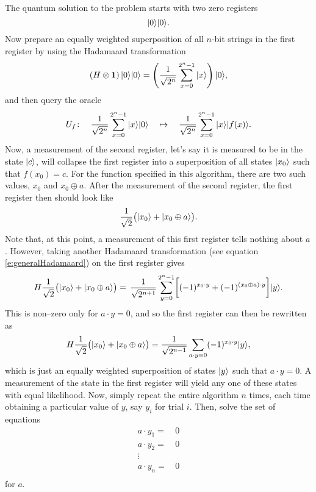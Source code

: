 The quantum solution to the problem starts with two zero registers
\begin{equation}
{|{0}\rangle}{|{0}\rangle}.
\end{equation}
Now prepare an equally weighted superposition of all $n$-bit strings
in the first register by using the Hadamaard transformation
\begin{equation}
\left(H\otimes\bf{1}\right){|{0}\rangle}{|{0}\rangle} =
\left(\frac{1}{\sqrt{2^n}}\sum_{x=0}^{2^n-1}{|{x}\rangle}\right){|{0}\rangle},
\end{equation}
and then query the oracle
\begin{equation}
U_f\colon\quad
\frac{1}{\sqrt{2^n}}\sum_{x=0}^{2^n-1}{|{x}\rangle}{|{0}\rangle}\quad\mapsto\quad
\frac{1}{\sqrt{2^n}}\sum_{x=0}^{2^n-1}{|{x}\rangle}{|{f(x)}\rangle}.
\end{equation}
Now, a measurement of the second register, let's say it is measured
to be in the state ${|{c}\rangle}$,
will collapse the first register into a superposition of all 
states ${|{x_0}\rangle}$ such that $f(x_0)=c$.  
For the function specified in this algorithm, 
there are two such values, $x_0$ and $x_0\oplus a$.
After the measurement of the second register, 
the first register then should look like 
\begin{equation}
\frac{1}{\sqrt{2}}\bigl({|{x_0}\rangle}+{|{x_0\oplus a}\rangle}\bigr).
\end{equation}
Note that, at this point, a measurement of this first register tells
nothing about $a$.  However, taking another Hadamaard transformation 
(see equation \ref{e:generalHadamaard})
on the first register gives 
\begin{equation}
H \frac{1}{\sqrt{2}}\bigl({|{x_0}\rangle}+{|{x_0\oplus a}\rangle}\bigr)=
\,\frac{1}{\sqrt{2^{n+1}}}\sum_{y=0}^{2^n-1}
\biggl[(-1)^{x_0\cdot y}+(-1)^{(x_0\oplus a)\cdot y}\biggr]{|{y}\rangle}.
\end{equation}
This is non--zero only for $a\cdot y=0$, and so the first register
can then be rewritten as
\begin{equation}
H \frac{1}{\sqrt{2}}\bigl({|{x_0}\rangle}+{|{x_0\oplus a}\rangle}\bigr)
=\frac{1}{\sqrt{2^{n-1}}}\sum_{a\cdot y=0}
(-1)^{x_0\cdot y}{|{y}\rangle},
\end{equation}
which is just an equally weighted superposition of states
${|{y}\rangle}$ such that $a\cdot y = 0$.
A measurement of the state in the first register will yield
any one of these states with equal likelihood.  Now, simply
repeat the entire algorithm $n$ times, each time obtaining
a particular value of $y$, say $y_i$ for trial $i$.
Then, solve the set of equations
\begin{equation}
\begin{split}
a\cdot y_1 =&\, 0\\
a\cdot y_2 =&\, 0\\
\vdots\quad&\\
a\cdot y_n =&\, 0\\
\end{split}
\end{equation}
for $a$.

